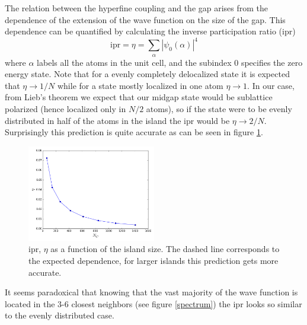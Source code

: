 The relation between the hyperfine coupling and the gap arises from the dependence of the extension of the  wave function on the size of the gap. This dependence can be quantified by calculating the inverse participation ratio (ipr)
\begin{equation}
  \text{ipr} = \eta = \displaystyle\sum_{\alpha}|\psi_{0}(\alpha)|^4
\end{equation}
where $\alpha$ labels all the atoms  in the unit cell, and the subindex $0$ specifies the zero energy state. Note that for a evenly completely delocalized state it is expected that $\eta\rightarrow1/N$ while for a state mostly localized in one atom $\eta\rightarrow1$. In our case, from Lieb's theorem we expect that our midgap state would be sublattice polarized (hence localized only in $N/2$ atoms), so if the state were to be evenly distributed in half of the atoms in the island the ipr would be $\eta\rightarrow2/N$. Surprisingly this prediction is quite accurate as can be seen in figure \ref{ipr}.
\begin{figure}
\centering
\includegraphics[width=0.5\textwidth]{chapter05/figures/ipr.png}
\caption{ ipr, $\eta$ as a function of the island size. The dashed line corresponds to the expected dependence, for larger islands this prediction gets more accurate.}
\label{ipr}
\end{figure}
\FloatBarrier
It seems paradoxical that knowing that the vast majority of the wave function is located in the 3-6 closest neighbors (see figure \ref{spectrum}) the ipr looks so similar to the evenly distributed case.


